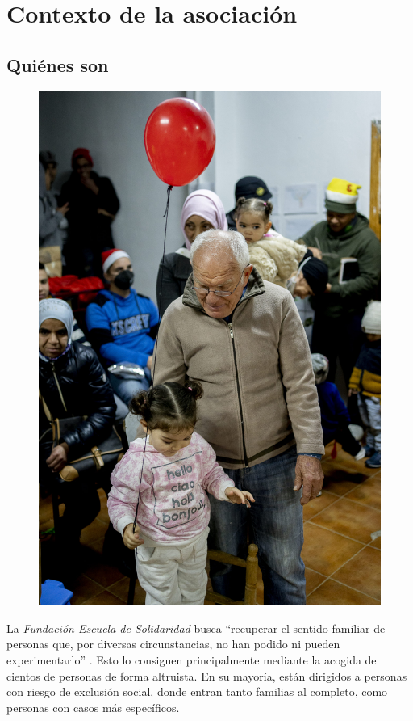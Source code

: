 \section{Contexto de la asociación}
\label{sec:asociacion}

\subsection{Quiénes son}

\begin{figure}
    \centering
    \includegraphics[width=0.9\linewidth]{imagenes/fes/gente.jpg}
\end{figure}

La \textit{Fundación Escuela de Solidaridad} busca ``recuperar el sentido familiar de personas que, por diversas circunstancias, no han podido ni pueden experimentarlo'' \cite{web-feds}. Esto lo consiguen principalmente mediante la acogida de cientos de personas de forma altruista. En su mayoría, están dirigidos a personas con riesgo de exclusión social, donde entran tanto familias al completo, como personas con casos más específicos.

